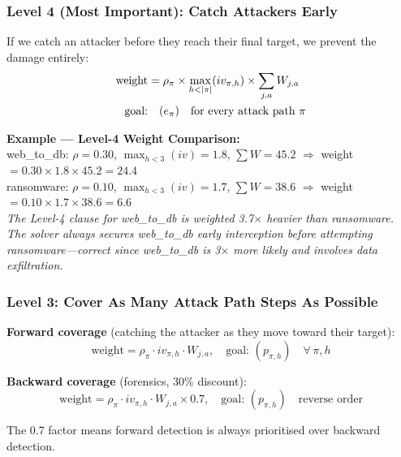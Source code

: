 \documentclass[journal]{IEEEtran}
\begin{document}
\subsubsection{Level 4 (Most Important): Catch Attackers Early}

If we catch an attacker before they reach their final target,
we prevent the damage entirely:
\begin{align}
  \text{weight} &= \rho_\pi \times
    \max_{h < |\pi|}(iv_{\pi,h}) \times
    \sum_{j,a} W_{j,a} \notag \\
  \text{goal:} &\quad (e_\pi)
    \quad \text{for every attack path } \pi
\end{align}

\begin{examplebox}
\textbf{Example --- Level-4 Weight Comparison:}\\[3pt]
web\_to\_db: $\rho=0.30$, $\max_{h<3}(iv)=1.8$,
$\sum W=45.2$
$\Rightarrow$ weight $=0.30\times1.8\times45.2=\mathbf{24.4}$\\
ransomware: $\rho=0.10$, $\max_{h<3}(iv)=1.7$,
$\sum W=38.6$
$\Rightarrow$ weight $=0.10\times1.7\times38.6=\mathbf{6.6}$\\[3pt]
\textit{The Level-4 clause for web\_to\_db is weighted
3.7$\times$ heavier than ransomware.
The solver always secures web\_to\_db early interception
before attempting ransomware---correct since web\_to\_db
is 3$\times$ more likely and involves data exfiltration.}
\end{examplebox}

\subsubsection{Level 3: Cover As Many Attack Path Steps
              As Possible}

\textbf{Forward coverage} (catching the attacker as they
move toward their target):
\begin{equation}
  \text{weight} = \rho_\pi \cdot iv_{\pi,h} \cdot W_{j,a},
  \quad \text{goal: } (p_{\pi,h})
  \quad \forall\,\pi, h
\end{equation}

\textbf{Backward coverage} (forensics, 30\% discount):
\begin{equation}
  \text{weight} = \rho_\pi \cdot iv_{\pi,h} \cdot W_{j,a}
  \times 0.7, \quad \text{goal: } (p_{\pi,h})
  \quad \text{reverse order}
\end{equation}

The 0.7 factor means forward detection is always prioritised
over backward detection.
\end{document}
